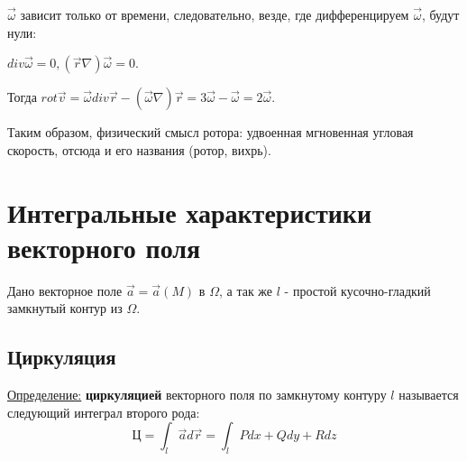 \documentclass[12pt]{article}
\begin{document}
$\overrightarrow{\omega}$ зависит только от времени, следовательно, везде, где дифференцируем $\overrightarrow{\omega}$, будут нули:\par
$div \overrightarrow{\omega} = 0, (\overrightarrow{r} \nabla) \overrightarrow{\omega} = 0$.\par
Тогда $rot \overrightarrow{v} = \overrightarrow{\omega} div \overrightarrow{r} - (\overrightarrow{\omega} \nabla)\overrightarrow{r} = 3\overrightarrow{\omega} - \overrightarrow{\omega} = 2\overrightarrow{\omega}$.\par
Таким образом, физический смысл ротора: удвоенная мгновенная угловая скорость, отсюда и его названия (ротор, вихрь).\par
\section{Интегральные характеристики векторного поля}
Дано векторное поле $\overrightarrow{a} = \overrightarrow{a}(M)$ в $\Omega$, а так же $l$ - простой кусочно-гладкий замкнутый контур из $\Omega$.\par
\subsection{Циркуляция}
\uline{Определение:} \textbf{циркуляцией} векторного поля по замкнутому контуру $l$ называется следующий интеграл второго рода:
$$\text{Ц} = \int_l \overrightarrow{a} d\overrightarrow{r} = \int_l Pdx + Qdy + Rdz$$
\end{document}
